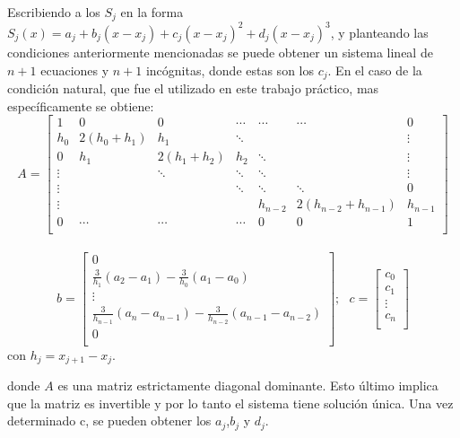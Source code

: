\documentclass[a4paper]{article}
\begin{document}
Escribiendo a los $ S_j $ en la forma $S_j(x) = a_j + b_j(x-x_j)+c_j(x-x_j)^2+d_j(x-x_j)^3$, y planteando las condiciones anteriormente mencionadas se puede obtener un sistema lineal de $ n+1 $ ecuaciones y $ n+1 $ incógnitas, donde estas son los $ c_{j} $. En el caso de la condición natural, que fue el utilizado en este trabajo práctico, mas específicamente se obtiene:
$$
A =
\begin{bmatrix}
    1      & 0                  & 0      & \cdots & \cdots  & \cdots             & 0      \\
    h_0    & 2(h_0+h_1)         & h_1    & \ddots &         &                    & \vdots \\
    0      & h_1 & 2(h_1 + h_2) & h_2    & \ddots &         &                     \vdots \\
    \vdots &                    & \ddots & \ddots & \ddots  &                    & \vdots \\
    \vdots &                    &        & \ddots & \ddots  & \ddots             & 0      \\
    \vdots &                    &        &        & h_{n-2} & 2(h_{n-2}+h_{n-1}) & h_{n-1} \\
    0      & \cdots             & \cdots & \cdots & 0       & 0                  & 1 \\
\end{bmatrix}
$$ \\
$$
b=
\begin{bmatrix}
0 \\
\frac{3}{h_1}(a_2-a_1)-\frac{3}{h_0}(a_1-a_0) \\
\vdots \\
\frac{3}{h_{n-1}}(a_n-a_{n-1})-\frac{3}{h_{n-2}}(a_{n-1}-a_{n-2}) \\
0 \\
\end{bmatrix}
;  \  \ \ 
c=
\begin{bmatrix}
c_0\\
c_1\\
\vdots \\
c_n\\
\end{bmatrix}
$$
con $h_j=x_{j+1}-x_j$.

donde $ A $ es una matriz estrictamente diagonal dominante. Esto último implica que la matriz es invertible y por lo tanto el sistema tiene solución única. Una vez determinado c, se pueden obtener los $ a_{j}$,$ b_{j} $ y $d_{j}$.
\end{document}
